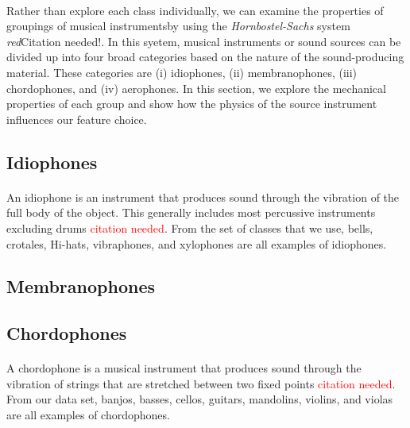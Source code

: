 \documentclass[12pt,letterpaper]{article}
\begin{document}
\paragraph*{}Rather than explore each class individually, we can examine the properties of groupings of musical instrumentsby using the \textit{Hornbostel-Sachs} system \textit{red}{Citation needed!}. In this syetem, musical instruments or sound sources can be divided up into four broad categories based on the nature of the sound-producing material. These categories are (i) idiophones, (ii) membranophones, (iii) chordophones, and (iv) aerophones. In this section, we explore the mechanical properties of each group and show how the physics of the source instrument influences our feature choice.



\subsection{Idiophones}
\label{subsec-Idiophone}

\paragraph*{}An idiophone is an instrument that produces sound through the vibration of the full body of the object. This generally includes most percussive instruments excluding drums \textcolor{red}{citation needed}. From the set of classes that we use, bells, crotales, Hi-hats, vibraphones, and xylophones are all examples of idiophones. 


\subsection{Membranophones}
\label{subsec-membranophones}


\subsection{Chordophones}
\label{subsec-chordophones}

\paragraph*{}A chordophone is a musical instrument that produces sound through the vibration of strings that are stretched between two fixed points \textcolor{red}{citation needed}. From our data set, banjos, basses, cellos, guitars, mandolins, violins, and violas are all examples of chordophones.
\end{document}
